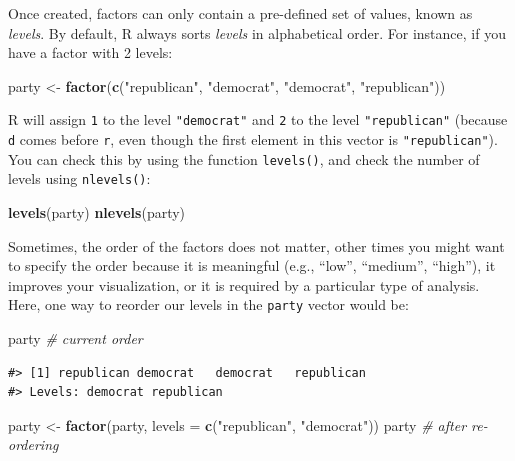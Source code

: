 \documentclass[]{book}
\newenvironment{Shaded}{\begin{snugshade}}{\end{snugshade}}
\newcommand{\KeywordTok}[1]{\textcolor[rgb]{0.13,0.29,0.53}{\textbf{{#1}}}}
\newcommand{\DataTypeTok}[1]{\textcolor[rgb]{0.13,0.29,0.53}{{#1}}}
\newcommand{\StringTok}[1]{\textcolor[rgb]{0.31,0.60,0.02}{{#1}}}
\newcommand{\CommentTok}[1]{\textcolor[rgb]{0.56,0.35,0.01}{\textit{{#1}}}}
\newcommand{\NormalTok}[1]{{#1}}
\theoremstyle{definition}
\theoremstyle{definition}
\theoremstyle{remark}
\begin{document}
Once created, factors can only contain a pre-defined set of values,
known as \emph{levels}. By default, R always sorts \emph{levels} in
alphabetical order. For instance, if you have a factor with 2 levels:

\begin{Shaded}
\begin{Highlighting}[]
\NormalTok{party <-}\StringTok{ }\KeywordTok{factor}\NormalTok{(}\KeywordTok{c}\NormalTok{(}\StringTok{"republican"}\NormalTok{, }\StringTok{"democrat"}\NormalTok{, }\StringTok{"democrat"}\NormalTok{, }\StringTok{"republican"}\NormalTok{))}
\end{Highlighting}
\end{Shaded}

R will assign \texttt{1} to the level \texttt{"democrat"} and \texttt{2}
to the level \texttt{"republican"} (because \texttt{d} comes before
\texttt{r}, even though the first element in this vector is
\texttt{"republican"}). You can check this by using the function
\texttt{levels()}, and check the number of levels using
\texttt{nlevels()}:

\begin{Shaded}
\begin{Highlighting}[]
\KeywordTok{levels}\NormalTok{(party)}
\KeywordTok{nlevels}\NormalTok{(party)}
\end{Highlighting}
\end{Shaded}

Sometimes, the order of the factors does not matter, other times you
might want to specify the order because it is meaningful (e.g., ``low'',
``medium'', ``high''), it improves your visualization, or it is required
by a particular type of analysis. Here, one way to reorder our levels in
the \texttt{party} vector would be:

\begin{Shaded}
\begin{Highlighting}[]
\NormalTok{party }\CommentTok{# current order}
\end{Highlighting}
\end{Shaded}

\begin{verbatim}
#> [1] republican democrat   democrat   republican
#> Levels: democrat republican
\end{verbatim}

\begin{Shaded}
\begin{Highlighting}[]
\NormalTok{party <-}\StringTok{ }\KeywordTok{factor}\NormalTok{(party, }\DataTypeTok{levels =} \KeywordTok{c}\NormalTok{(}\StringTok{"republican"}\NormalTok{, }\StringTok{"democrat"}\NormalTok{))}
\NormalTok{party }\CommentTok{# after re-ordering}
\end{Highlighting}
\end{Shaded}
\end{document}
